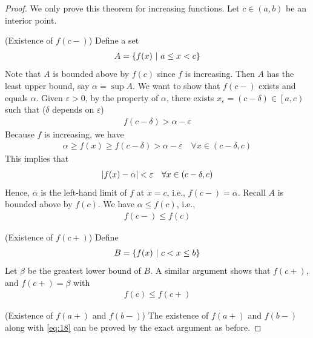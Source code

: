 \documentclass[thmcnt=section, 12pt]{my-elegantbook}
\begin{document}
\begin{proof}
    We only prove this theorem for increasing functions. Let $c \in (a, b)$ be an interior point.

    \par (Existence of $f(c-)$) Define a set
    \begin{align*}
        A = \left\{ f(x) \ \middle| \ a \leq x < c \right\}
    \end{align*}
    Note that $A$ is bounded above by $f(c)$ since $f$ is increasing. Then $A$ has the least upper bound, say $\alpha = \sup A$. We want to show that $f(c-)$ exists and equals $\alpha$. Given $\varepsilon > 0$, by the property of $\alpha$, there exists $x_\varepsilon = (c - \delta) \in \left[ a, c \right) $ such that ($\delta$ depends on $\varepsilon$)
    \begin{align*}
        f(c - \delta) > \alpha - \varepsilon
    \end{align*}
    Because $f$ is increasing, we have
    \begin{align*}
        \alpha \geq f(x) \geq f(c-\delta) > \alpha-\varepsilon
        \quad \forall x \in (c-\delta, c)
    \end{align*}
    This implies that
    \begin{align*}
        \left\lvert f(x) - \alpha \right\rvert < \varepsilon
        \quad \forall x \in (c-\delta, c)
    \end{align*}
    Hence, $\alpha$ is the left-hand limit of $f$ at $x = c$, i.e., $f(c-) = \alpha$. Recall $A$ is bounded above by $f(c)$. We have $\alpha \leq f(c)$, i.e.,
    \begin{align*}
        f(c-) \leq f(c)
    \end{align*}

    \par (Existence of $f(c+)$) Define
    \begin{align*}
        B = \left\{ f(x) \ \middle| \ c < x \leq b \right\}
    \end{align*}
    Let $\beta$ be the greatest lower bound of $B$. A similar argument shows that $f(c+)$, and $f(c+) = \beta$ with
    \begin{align*}
        f(c) \leq f(c+)
    \end{align*}

    \par (Existence of $f(a+)$ and $f(b-)$) The existence of $f(a+)$ and $f(b-)$ along with \eqref{eq:18} can be proved by the exact argument as before.
\end{proof}

\end{document}
